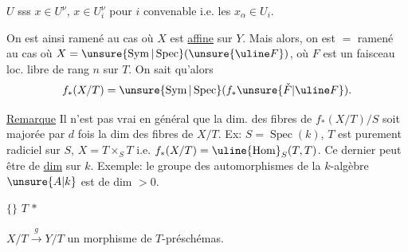 $U$ sss $x\in U^\nu$,   $x\in U_i^\nu$ pour $i$ convenable i.e. les $x_\alpha\in U_i$. 

On est ainsi ramené au cas où $X$ est \uline{affine} sur $Y$. Mais alors, on est $=$ ramené au cas où $X=\unsure{\operatorname{Sym}|\operatorname{Spec}}(\unsure{\uline F})$, où $F$ est un faisceau loc. libre de rang $n$ sur $T$. On sait qu'alors
\[
f_*(X/T)=\unsure{\operatorname{Sym}|\operatorname{Spec}}(f_*\unsure{\check F|\uline F}).
\]


\uline{Remarque} Il n'est pas vrai en général que la dim. des fibres de $f_*(X/T)/S$ soit majorée par $d$ fois la dim des fibres de  $X/T$. Ex:
$S=\operatorname{Spec}(k)$, $T$ est purement radiciel sur $S$, $X=T\times_S T$ i.e. $f_*(X/T)=\uline{\operatorname{Hom}}_S(T,T)$. Ce dernier peut être de \uline{dim}   sur $k$. Exemple: le groupe des automorphismes de la $k$-algèbre $\unsure{A|k}$ est de dim $>0$.


 $\{$$\}$ $T$   $*$

$X/T\xrightarrow{g}Y/T$ un morphisme   de $T$-préschémas.

